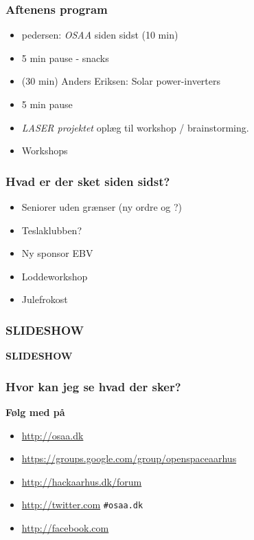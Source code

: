 \documentclass{beamer}
\begin{document}
\begin{frame}
  \frametitle{Aftenens program}
  \begin{itemize}
  \item pedersen: \emph{OSAA} siden sidst (10 min)
  \item 5 min pause - snacks
  \item  (30 min) Anders Eriksen: Solar power-inverters     
  \item 5 min pause
  \item \emph{LASER projektet}  oplæg til workshop / brainstorming.
  \item Workshops

  \end{itemize}						
\end{frame}

\begin{frame}
  \frametitle{Hvad er der sket siden sidst?}
  \begin{itemize}
  \item Seniorer uden grænser (ny ordre og ?)
  \item Teslaklubben?
  \item Ny sponsor EBV
  \item Loddeworkshop
  \item Julefrokost 
  \end{itemize}						
\end{frame}


\begin{frame}
  \frametitle{SLIDESHOW}
  \textbf{SLIDESHOW}
\end{frame}



\begin{frame}
  \frametitle{Hvor kan jeg se hvad der sker?}
  \textbf{Følg med på}
  \begin{itemize}
  \item  \url{http://osaa.dk}
  \item  \url{https://groups.google.com/group/openspaceaarhus}
  \item  \url{http://hackaarhus.dk/forum}
  \item  \url{http://twitter.com} \texttt{\#osaa.dk}
  \item  \url{http://facebook.com} 
  \end{itemize}						
\end{frame}
\end{document}
